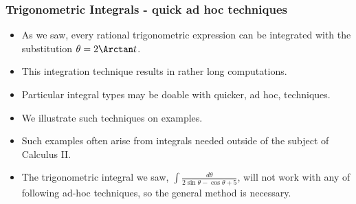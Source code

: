 \begin{frame}
\frametitle{Trigonometric Integrals - quick ad hoc techniques}
\begin{itemize}
\item As we saw, every rational trigonometric expression can be integrated with the substitution $\theta=2\Arctan t$.
\item<2-> This integration technique results in rather long computations. 
\item<3-> Particular integral types may be doable with quicker, ad hoc, techniques.
\item<4-> We illustrate such techniques on examples. 
\item<5-> Such examples often arise from integrals needed outside of the subject of Calculus II.
\item<6-> The trigonometric integral we saw, $\int \frac{d\theta}{2\sin \theta -\cos\theta+5}$, will not work with any of following ad-hoc techniques, so the general method is necessary.
\end{itemize}
\end{frame}

